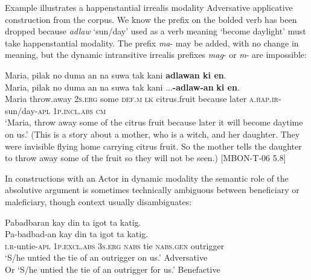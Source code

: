 Example  illustrates a happenstantial irrealis modality Adversative applicative construction from the corpus. We know the prefix on the bolded verb has been dropped because \textit{adlaw} `sun/day' used as a verb meaning `become daylight' must take happenstantial modality. The prefix \textit{ma}- may be added, with no change in meaning, but the dynamic intransitive irrealis prefixes \textit{mag}- or \textit{m}- are impossible:

\ea
\label{bkm:Ref118208801}
Maria,  pilak  no  duma  an  na  suwa  tak  kani \textbf{adlawan  ki  en}. \\\smallskip
\gll Maria,  pilak  no  duma  an  na  suwa  tak  kani ...\textbf{-adlaw-an}  \textbf{ki  en}. \\
Maria  throw.away  2\textsc{s.erg}  some  \textsc{def.m}  \textsc{lk}  citrus.fruit  because  later \textsc{a.hap.ir}-sun/day-\textsc{apl}  1\textsc{p.incl.abs}  \textsc{cm} \\
\glt `Maria, throw away some of the citrus fruit because later it will become daytime on us.’ (This is a story about a mother, who is a witch, and her daughter. They were invisible flying home carrying citrus fruit. So the mother tells the daughter to throw away some of the fruit so they will not be seen.) [MBON-T-06 5.8]
\z

In constructions with an Actor in dynamic modality the semantic role of the absolutive argument is sometimes technically ambiguous between beneficiary or maleficiary, though context usually disambiguates:

\ea
Pabadbaran  kay  din  ta  igot  ta  katig. \\\smallskip
\gll Pa-badbad-an  kay  din  ta  igot  ta  katig. \\
\textsc{i.r}-untie-\textsc{apl}  1\textsc{p.excl.abs}  3\textsc{s.erg}  \textsc{nabs}  tie  \textsc{nabs.gen}  outrigger \\
\glt ‘S/he untied the tie of an outrigger on us.’ Adversative \\
 Or ‘S/he untied the tie of an outrigger for us.’ Benefactive
\z

